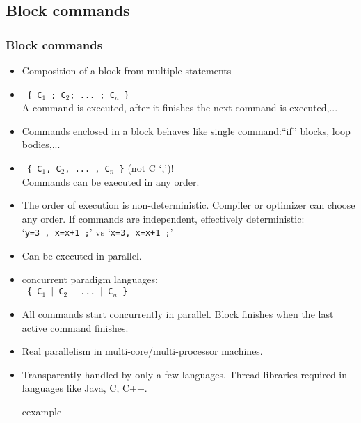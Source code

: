 \subsection{Block commands}
\begin{frame}
 \frametitle{Block commands}
\begin{itemize}
 \item Composition of a block from multiple statements
 \item {} \texttt{ \{ C$_1$ ; C$_2$; ... ; C$_n$ \}} \\
A command is executed, after it finishes the next command is executed,...     
\item  Commands enclosed in a block behaves like single command:``if'' blocks, loop bodies,... 
\item {}
\texttt{ \{  C$_1$, C$_2$, ... , C$_n$ \}} \alert{\scriptsize (not C `,')!}\\ Commands can be executed in any order.
\item The order of execution is non-deterministic. Compiler or optimizer can choose any order. If commands are independent, effectively deterministic:\\`\texttt{y=3 , x=x+1 ;}' vs `\texttt{x=3, x=x+1 ;}'
\item Can be executed in parallel.
\end{itemize}
\end{frame}


\begin{frame}
\begin{itemize}
  \item {} concurrent paradigm languages:\\
\texttt{ \{  C$_1$ $\mid$ C$_2$ $\mid$ ... $\mid$ C$_n$ \}}
  \item All commands start concurrently in parallel. Block finishes when the last active command finishes.
  \item Real parallelism in multi-core/multi-processor machines.
  \item Transparently handled by only a few languages. Thread libraries required in languages like Java, C, C++.
\begin{beamercolorbox}{cexample}
 \codethreadC
\end{beamercolorbox}

\end{itemize}
\end{frame}


